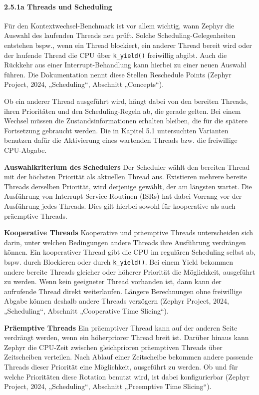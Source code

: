 \paragraph*{\textbf{2.5.1a Threads und Scheduling}}
Für den Kontextwechsel-Benchmark ist vor allem wichtig, wann Zephyr die Auswahl des laufenden Threads neu prüft. Solche Scheduling-Gelegenheiten entstehen bspw., wenn ein Thread blockiert, ein anderer Thread bereit wird oder der laufende Thread die CPU über \lstinline[style=fileinline]|k_yield()| freiwillig abgibt. Auch die Rückkehr aus einer Interrupt-Behandlung kann hierbei zu einer neuen Auswahl führen. Die Dokumentation nennt diese Stellen Reschedule Points (Zephyr Project, 2024, „Scheduling“, Abschnitt „Concepts“).

Ob ein anderer Thread ausgeführt wird, hängt dabei von den bereiten Threads, ihren Prioritäten und den Scheduling-Regeln ab, die gerade gelten. Bei einem Wechsel müssen die Zustandsinformationen erhalten bleiben, die für die spätere Fortsetzung gebraucht werden. Die in Kapitel 5.1 untersuchten Varianten benutzen dafür die Aktivierung eines wartenden Threads bzw. die freiwillige CPU-Abgabe.

\textbf{Auswahlkriterium des} \textbf{Schedulers} Der Scheduler wählt den bereiten Thread mit der höchsten Priorität als aktuellen Thread aus. Existieren mehrere bereite Threads derselben Priorität, wird derjenige gewählt, der am längsten wartet. Die Ausführung von Interrupt-Service-Routinen (ISRs) hat dabei Vorrang vor der Ausführung jedes Threads. Dies gilt hierbei sowohl für kooperative als auch präemptive Threads.

\textbf{Kooperative Threads }Kooperative und präemptive Threads unterscheiden sich darin, unter welchen Bedingungen andere Threads ihre Ausführung verdrängen können. Ein kooperativer Thread gibt die CPU im regulären Scheduling selbst ab, bspw. durch Blockieren oder durch \lstinline[style=fileinline]|k_yield()|. Bei einem Yield bekommen andere bereite Threads gleicher oder höherer Priorität die Möglichkeit, ausgeführt zu werden. Wenn kein geeigneter Thread vorhanden ist, dann kann der aufrufende Thread direkt weiterlaufen. Längere Berechnungen ohne freiwillige Abgabe können deshalb andere Threads verzögern (Zephyr Project, 2024, „Scheduling“, Abschnitt „Cooperative Time Slicing“).

\textbf{Präemptive Threads }Ein präemptiver Thread kann auf der anderen Seite verdrängt werden, wenn ein höherpriorer Thread breit ist. Darüber hinaus kann Zephyr die CPU-Zeit zwischen gleichprioren präemptiven Threads über Zeitscheiben verteilen. Nach Ablauf einer Zeitscheibe bekommen andere passende Threads dieser Priorität eine Möglichkeit, ausgeführt zu werden. Ob und für welche Prioritäten diese Rotation benutzt wird, ist dabei konfigurierbar (Zephyr Project, 2024, „Scheduling“, Abschnitt „Preemptive Time Slicing“).

